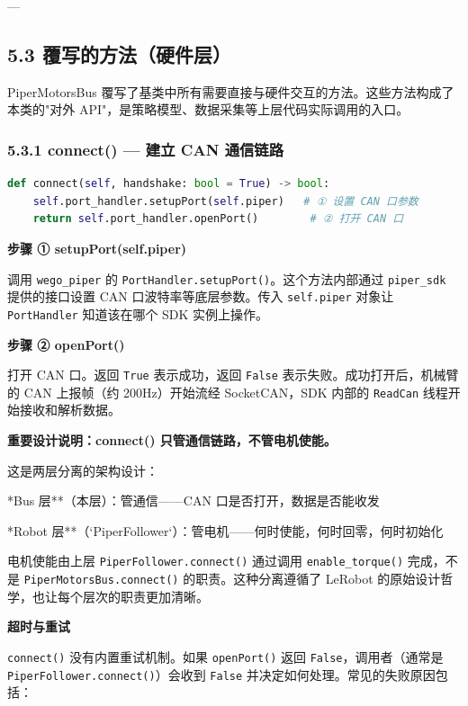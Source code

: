 \documentclass[UTF8,a4paper,11pt]{ctexart}
\begin{document}
---

\subsection{5.3 覆写的方法（硬件层）}

PiperMotorsBus 覆写了基类中所有需要直接与硬件交互的方法。这些方法构成了本类的"对外 API"，是策略模型、数据采集等上层代码实际调用的入口。

\subsubsection{5.3.1 connect() — 建立 CAN 通信链路}

\begin{lstlisting}[language=python]
def connect(self, handshake: bool = True) -> bool:
    self.port_handler.setupPort(self.piper)   # ① 设置 CAN 口参数
    return self.port_handler.openPort()        # ② 打开 CAN 口
\end{lstlisting}

\textbf{步骤 ① setupPort(self.piper)}

调用 \texttt{wego_piper} 的 \texttt{PortHandler.setupPort()}。这个方法内部通过 \texttt{piper_sdk} 提供的接口设置 CAN 口波特率等底层参数。传入 \texttt{self.piper} 对象让 \texttt{PortHandler} 知道该在哪个 SDK 实例上操作。

\textbf{步骤 ② openPort()}

打开 CAN 口。返回 \texttt{True} 表示成功，返回 \texttt{False} 表示失败。成功打开后，机械臂的 CAN 上报帧（约 200Hz）开始流经 SocketCAN，SDK 内部的 \texttt{ReadCan} 线程开始接收和解析数据。

\textbf{重要设计说明：connect() 只管通信链路，不管电机使能。}

这是两层分离的架构设计：

\item **Bus 层**（本层）：管通信——CAN 口是否打开，数据是否能收发
\item **Robot 层**（`PiperFollower`）：管电机——何时使能，何时回零，何时初始化

电机使能由上层 \texttt{PiperFollower.connect()} 通过调用 \texttt{enable_torque()} 完成，不是 \texttt{PiperMotorsBus.connect()} 的职责。这种分离遵循了 LeRobot 的原始设计哲学，也让每个层次的职责更加清晰。

\textbf{超时与重试}

\texttt{connect()} 没有内置重试机制。如果 \texttt{openPort()} 返回 \texttt{False}，调用者（通常是 \texttt{PiperFollower.connect()}）会收到 \texttt{False} 并决定如何处理。常见的失败原因包括：
\end{document}

